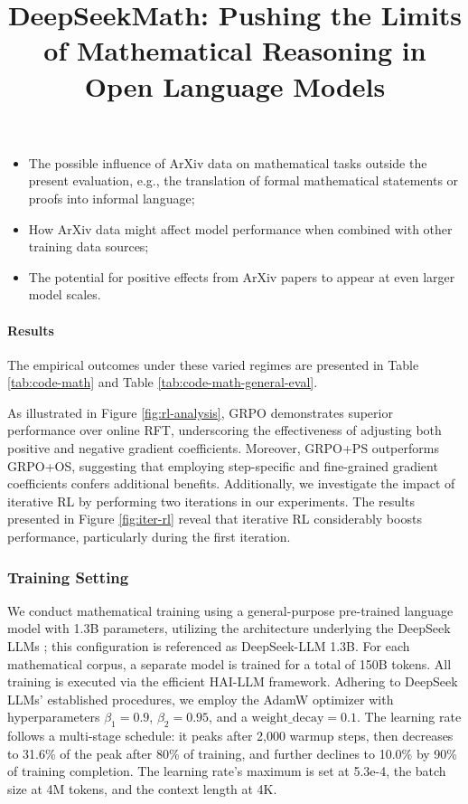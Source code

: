 \title{DeepSeekMath: Pushing the Limits of Mathematical Reasoning in Open Language Models}
\begin{itemize}[topsep=0pt]
    \item The possible influence of ArXiv data on mathematical tasks outside the present evaluation, e.g., the translation of formal mathematical statements or proofs into informal language;
    \item How ArXiv data might affect model performance when combined with other training data sources;
    \item The potential for positive effects from ArXiv papers to appear at even larger model scales.
\end{itemize}

\paragraph{Results}
The empirical outcomes under these varied regimes are presented in Table \ref{tab:code-math} and Table \ref{tab:code-math-general-eval}.

As illustrated in Figure \ref{fig:rl-analysis}, GRPO demonstrates superior performance over online RFT, underscoring the effectiveness of adjusting both positive and negative gradient coefficients. Moreover, GRPO+PS outperforms GRPO+OS, suggesting that employing step-specific and fine-grained gradient coefficients confers additional benefits. Additionally, we investigate the impact of iterative RL by performing two iterations in our experiments. The results presented in Figure \ref{fig:iter-rl} reveal that iterative RL considerably boosts performance, particularly during the first iteration.

\subsubsection{Training Setting}
\label{sec:quality-policy}
We conduct mathematical training using a general-purpose pre-trained language model with 1.3B parameters, utilizing the architecture underlying the DeepSeek LLMs \citep{deepseek-llm}; this configuration is referenced as DeepSeek-LLM 1.3B. For each mathematical corpus, a separate model is trained for a total of 150B tokens. All training is executed via the efficient HAI-LLM \citep{haillm} framework. Adhering to DeepSeek LLMs’ established procedures, we employ the AdamW optimizer \citep{adamW} with hyperparameters $\beta_1=0.9$, $\beta_2=0.95$, and a $\mathrm{weight\_decay}=0.1$. The learning rate follows a multi-stage schedule: it peaks after 2,000 warmup steps, then decreases to 31.6\% of the peak after 80\% of training, and further declines to 10.0\% by 90\% of training completion. The learning rate’s maximum is set at 5.3e-4, the batch size at 4M tokens, and the context length at 4K.

